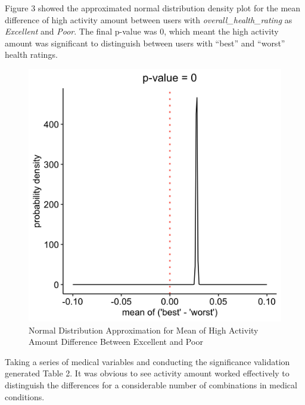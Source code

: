 \documentclass[12pt]{article}
\begin{document}
Figure 3 showed the approximated normal distribution density plot for
the mean difference of high activity amount between users with
\emph{overall\_health\_rating} as \emph{Excellent} and \emph{Poor}. The
final p-value was 0, which meant the high activity amount was
significant to distinguish between users with ``best'' and ``worst''
health ratings.

\begin{figure}[h]

{\centering \includegraphics[width=0.65\linewidth,height=0.45\textheight,]{fig3} 

}

\caption{Normal Distribution Approximation for Mean of High Activity Amount Difference Between Excellent and Poor}\label{fig:unnamed-chunk-7}
\end{figure}

Taking a series of medical variables and conducting the significance
validation generated Table 2. It was obvious to see activity amount
worked effectively to distinguish the differences for a considerable
number of combinations in medical conditions.
\end{document}
